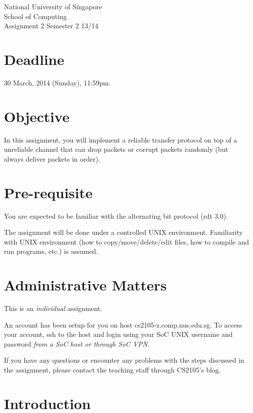 \documentclass[a4paper,11pt]{exam}
\begin{document}
    \extraheadheight{.5in}
    {\large\sf National University of Singapore\\ School of Computing \\
    \LARGE\sf Assignment 2}%
    {\large\sf Semester 2 13/14}
    \firstpageheadrule
    \pagestyle{headandfoot}

    \section*{Deadline}

    30 March, 2014 (Sunday), 11:59pm.

    \section*{Objective}

    In this assignment, you will implement a reliable transfer protocol on top of a unreliable channel that can drop packets or corrupt packets randomly (but always deliver packets in order).

    \section*{Pre-requisite}

You are expected to be familiar with the alternating bit protocol (rdt 3.0).

The assignment will be done under a controlled UNIX environment. Familiarity with UNIX environment (how to copy/move/delete/edit files, how to compile and run programs, etc.) is assumed.

\section*{Administrative Matters}

This is an \textit{individual} assignment.

An account has been setup for you on host cs2105-z.comp.nus.edu.sg. To access your account, ssh to the host and login using your SoC UNIX username and password \textit{from a SoC host or through SoC VPN}.

If you have any questions or encounter any problems with the steps discussed in the assignment, please contact the teaching staff through CS2105's blog.

\section*{Introduction}
\end{document}
